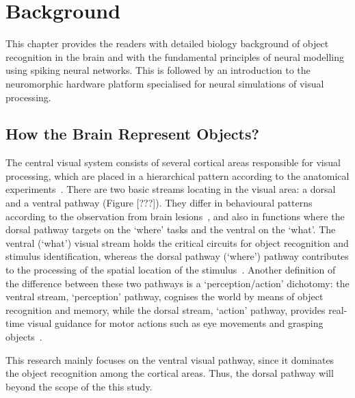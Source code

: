 \chapter{Background}
\label{cha:bkg}
This chapter provides the readers with detailed biology background of object recognition in the brain and with the fundamental principles of neural modelling using spiking neural networks.
This is followed by an introduction to the neuromorphic hardware platform specialised for neural simulations of visual processing.

\section{How the Brain Represent Objects?}
\label{sec:bio}
The central visual system consists of several cortical areas responsible for visual processing, which are placed in a hierarchical pattern according to the anatomical experiments~\cite{felleman1991distributed}.
There are two basic streams locating in the visual area: a dorsal and a ventral pathway (Figure [???]).
They differ in behavioural patterns according to the observation from brain lesions~\cite{prado2005two}, and also in functions where the dorsal pathway targets on the `where' tasks and the ventral on the `what'.
The ventral (`what') visual stream holds the critical circuits for object recognition and stimulus identification, whereas the dorsal pathway (`where') pathway contributes to the processing of the spatial location of the stimulus~\cite{prado2005two, Ungerleider1994157}.
Another definition of the difference between these two pathways is a `perception/action' dichotomy: the ventral stream, `perception' pathway, cognises the world by means of object recognition and memory, while the dorsal stream, `action' pathway, provides real-time visual guidance for motor actions such as eye movements and grasping objects~\cite{goodale1992separate}. 

This research mainly focuses on the ventral visual pathway, since it dominates the object recognition among the cortical areas.
Thus, the dorsal pathway will beyond the scope of the this study. 


